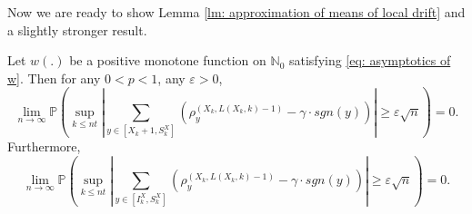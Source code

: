 \documentclass[EJP]{ejpecp} %
\newcommand{\abs}[1]{\left\vert #1 \right\vert}
\begin{document}
%		
Now we are ready to show Lemma \ref{lm: approximation of means of local drift}
and a slightly stronger result.
\begin{lemma}
	Let $w(.)$ be a positive monotone function on $\mathbb{N}_0$ satisfying \eqref{eq: asymptotics of w}. Then for any $0<p<1$, any $\varepsilon>0$,
	$$
	\lim_{n\to\infty} \mathbb{P}\left( \sup_{k\leq n t}  \abs{  	\sum_{y\in \left[X_{k}+1 ,S_{k}^X\right]} \left( \rho^{(X_k,L(X_k,k)-1)}_y -  \gamma \cdot sgn(y) \right) } \geq  \varepsilon \sqrt{n}     \right) =0.
	$$
	Furthermore,
	\[
	\lim_{n\to\infty} \mathbb{P}\left( \sup_{k\leq n t}  \abs{  	\sum_{y\in \left[I_k^{X} ,S_{k}^X\right]} \left( \rho^{(X_k,L(X_k,k)-1)}_y -  \gamma \cdot sgn(y) \right) } \geq  \varepsilon \sqrt{n}     \right) =0.
	\]
\end{lemma}
\end{document}
